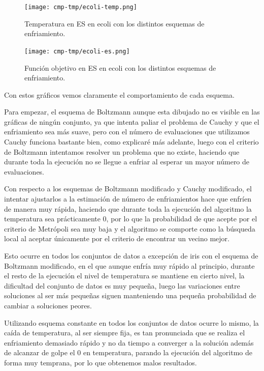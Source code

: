 \documentclass[12pt, spanish]{article}
\begin{document}
\begin{figure}[H]
	\centering
	\texttt{[image: cmp-tmp/ecoli-temp.png]}
	
	\caption{Temperatura en ES en ecoli con los distintos esquemas de enfriamiento.}
	\label{fig:es-cmp2}
\end{figure}

\begin{figure}[H]
	\centering
	\texttt{[image: cmp-tmp/ecoli-es.png]}
	
	\caption{Función objetivo en ES en ecoli con los distintos esquemas de enfriamiento.}
	\label{fig:es-cmp1}
\end{figure}


Con estos gráficos vemos claramente el comportamiento de cada esquema.

Para empezar, el esquema de Boltzmann aunque esta dibujado no es visible en las gráficas de ningún conjunto, ya que intenta paliar el problema de Cauchy y que el enfriamiento sea más suave, pero con el número de evaluaciones que utilizamos Cauchy funciona bastante bien, como explicaré más adelante, luego con el criterio de Boltzmann intentamos resolver un problema que no existe, haciendo que durante toda la ejecución no se llegue a enfriar al esperar un mayor número de evaluaciones.


Con respecto a los esquemas de Boltzmann modificado y Cauchy modificado, el intentar ajustarlos a la estimación de número de enfriamientos hace que enfríen de manera muy rápida, haciendo que durante toda la ejecución del algoritmo la temperatura sea prácticamente 0, por lo que la probabilidad de que acepte por el criterio de Metrópoli sea muy baja y el algoritmo se comporte como la búsqueda local al aceptar únicamente por el criterio de encontrar un vecino mejor. 

Esto ocurre en todos los conjuntos de datos a excepción de iris con el esquema de Boltzmann modificado, en el que aunque enfría muy rápido al principio, durante el resto de la ejecución el nivel de temperatura se mantiene en cierto nivel, la dificultad del conjunto de datos es muy pequeña, luego las variaciones entre soluciones al ser más pequeñas siguen manteniendo una pequeña probabilidad de cambiar a soluciones peores.

Utilizando esquema constante en todos los conjuntos de datos ocurre lo mismo, la caída de temperatura, al ser siempre fija, es tan pronunciada que se realiza el enfriamiento demasiado rápido y no da tiempo a converger a la solución además de alcanzar de golpe el 0 en temperatura, parando la ejecución del algoritmo de forma muy temprana, por lo que obtenemos malos resultados.
\end{document}
